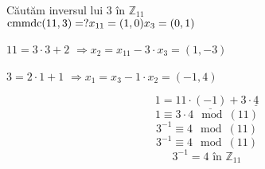 \documentclass[a4paper, 14pt]{scrartcl}
\DeclareMathOperator{\cmmdc}{cmmdc}
\begin{document}
C\u aut\u am inversul lui \(3\) \^ in \( \mathbb{Z}_{11}\) \\ 
\noindent 
\( 
\cmmdc(11, 3) = ? \\ 
x_{11} = (1, 0) 
 \\ 
x_{3} = (0, 1) 
\) 
 \\ 
\begin{paracol}{2}
\( 
11 = 3 \cdot 3 + 2
\) 
\switchcolumn
\( 
\Rightarrow x_{2} = x_{11} -3 \cdot x_{3} = (1, -3)
\) 
\end{paracol} 
\begin{paracol}{2}
\( 
3 = 2 \cdot 1 + 1
\) 
\switchcolumn
\( 
\Rightarrow x_{1} = x_{3} -1 \cdot x_{2} = (-1, 4)
\) 
\end{paracol} 
\[ 
1 = 11 \cdot \underline{(-1)} + 3 \cdot \underline{4} 
\] 
\[ 
1 \equiv 3 \cdot 4 \mod(11) 
\] 
\[ 
{3}^{-1} \equiv 4 \mod(11) 
\] 
\[ 
{3}^{-1} \equiv 4 \mod(11) 
\] 
\[ 
{3}^{-1} = 4 \text{ \^in } \mathbb{Z}_{11} 
\] 
\end{document}
